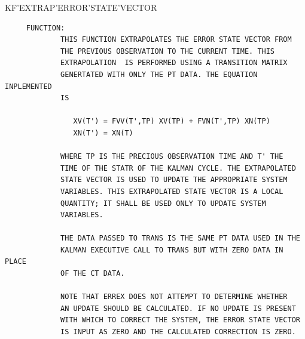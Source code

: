 \begin{frame}
KF'EXTRAP'ERROR'STATE'VECTOR
\begin{verbatim}
     FUNCTION:
             THIS FUNCTION EXTRAPOLATES THE ERROR STATE VECTOR FROM
             THE PREVIOUS OBSERVATION TO THE CURRENT TIME. THIS
             EXTRAPOLATION  IS PERFORMED USING A TRANSITION MATRIX
             GENERTATED WITH ONLY THE PT DATA. THE EQUATION INPLEMENTED
             IS

                XV(T') = FVV(T',TP) XV(TP) + FVN(T',TP) XN(TP)
                XN(T') = XN(T)

             WHERE TP IS THE PRECIOUS OBSERVATION TIME AND T' THE
             TIME OF THE STATR OF THE KALMAN CYCLE. THE EXTRAPOLATED
             STATE VECTOR IS USED TO UPDATE THE APPROPRIATE SYSTEM
             VARIABLES. THIS EXTRAPOLATED STATE VECTOR IS A LOCAL
             QUANTITY; IT SHALL BE USED ONLY TO UPDATE SYSTEM
             VARIABLES.

             THE DATA PASSED TO TRANS IS THE SAME PT DATA USED IN THE
             KALMAN EXECUTIVE CALL TO TRANS BUT WITH ZERO DATA IN PLACE
             OF THE CT DATA.

             NOTE THAT ERREX DOES NOT ATTEMPT TO DETERMINE WHETHER
             AN UPDATE SHOULD BE CALCULATED. IF NO UPDATE IS PRESENT
             WITH WHICH TO CORRECT THE SYSTEM, THE ERROR STATE VECTOR
             IS INPUT AS ZERO AND THE CALCULATED CORRECTION IS ZERO.

\end{verbatim}
\end{frame}
